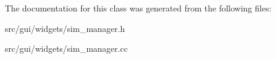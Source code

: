 The documentation for this class was generated from the following files\+:\begin{DoxyCompactItemize}
\item 
src/gui/widgets/sim\+\_\+manager.\+h\item 
src/gui/widgets/sim\+\_\+manager.\+cc\end{DoxyCompactItemize}
